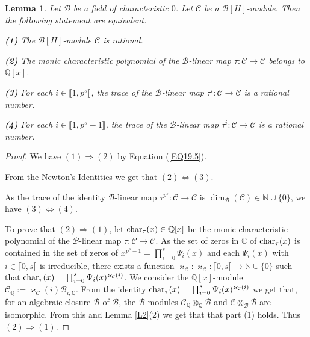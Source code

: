 \documentclass[11pt]{amsart}
\newtheorem{lemma}[theorem]{Lemma}
\def\char{\textup{char}}
\begin{document}
\begin{lemma}\label{L3}
Let $\mathcal B$ be a field of characteristic $0$. Let $\mathcal C$ be a $\mathcal B[H]$-module. Then the following statement are equivalent.

\medskip
{\bf (1)} The  $\mathcal B[H]$-module $\mathcal C$ is rational.

\smallskip
{\bf (2)} The monic characteristic polynomial of the $\mathcal B$-linear map $\tau:\mathcal C\rightarrow \mathcal C$ belongs to $\mathbb Q[x]$.

\smallskip
{\bf (3)} For each $i\in\llbracket1,p^s\rrbracket$, the trace of  the $\mathcal B$-linear map $\tau^i:\mathcal C\rightarrow \mathcal C$ is a rational number.

\smallskip
{\bf (4)} For each $i\in\llbracket1,p^s-1\rrbracket$, the trace of  the $\mathcal B$-linear map $\tau^i:\mathcal C\rightarrow \mathcal C$ is a rational number.
\end{lemma}

\begin{proof}
We have $(1)\Rightarrow (2)$ by Equation (\ref{EQ19.5}). 

From the Newton's Identities we get that $(2)\Leftrightarrow (3)$. 

As the trace of the identity $\mathcal B$-linear map $\tau^{p^s}:\mathcal C\rightarrow \mathcal C$ is $\dim_{\mathcal B}(\mathcal C)\in\mathbb N\cup\{0\}$, we have $(3)\Leftrightarrow (4)$. 

To prove that $(2)\Rightarrow (1)$, let $\char_{\tau}(x)\in\mathbb Q[x]$ be the monic characteristic polynomial of the $\mathcal B$-linear map $\tau:\mathcal C\rightarrow \mathcal C$. As the set of zeros in $\mathbb C$ of $\char_{\tau}(x)$ is contained in the set of zeros of $x^{p^s-1}=\prod_{i=0}^s \Psi_i(x)$ and each $\Psi_i(x)$ with $i\in\llbracket0,s\rrbracket$ is irreducible, there exists a function $\varkappa_{\mathcal C}:\varkappa_{\mathcal C}:\llbracket0,s\rrbracket\rightarrow\mathbb N\cup\{0\}$ such that $\char_{\tau}(x)=\prod_{i=0}^s \Psi_i(x)^{\varkappa_{\mathcal C}(i)}$. We consider the $\mathbb Q[x]$-module $\mathcal C_{\mathbb Q}:=\varkappa_{\mathcal C}(i)\mathcal B_{i,\mathbb Q}$. From the identity $\char_{\tau}(x)=\prod_{i=0}^s \Psi_i(x)^{\varkappa_{\mathcal C}(i)}$ we get that, for an algebraic closure $\overline{\mathcal B}$ of $\mathcal B$, the $\overline{\mathcal B}$-modules $\mathcal C_{\mathbb Q}\otimes_{\mathbb Q} \overline{\mathcal B}$ and $\mathcal C\otimes_{\mathcal B} \overline{\mathcal B}$ are isomorphic. From this and Lemma \ref{L2}(2) we get that that part (1) holds. Thus $(2)\Rightarrow (1)$.
\end{proof}
\end{document}
